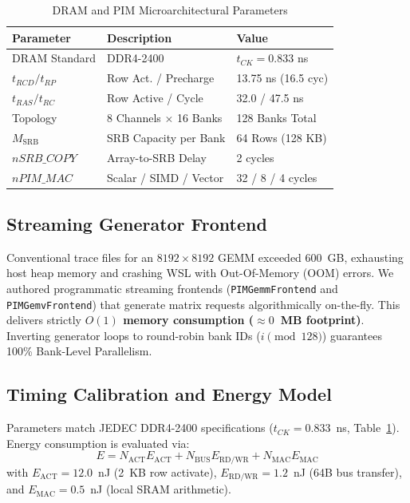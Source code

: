 \documentclass[10pt,twocolumn]{article}
\begin{document}
\begin{table}[t]
\centering
\footnotesize
\caption{DRAM and PIM Microarchitectural Parameters}
\label{tab:dram_timings}
\begin{tabularx}{\columnwidth}{lXl}
\toprule
\textbf{Parameter} & \textbf{Description} & \textbf{Value} \\
\midrule
DRAM Standard & DDR4-2400 & $t_{CK} = 0.833$ ns \\
$t_{RCD} / t_{RP}$ & Row Act. / Precharge & 13.75 ns (16.5 cyc) \\
$t_{RAS} / t_{RC}$ & Row Active / Cycle & 32.0 / 47.5 ns \\
Topology & 8 Channels $\times$ 16 Banks & 128 Banks Total \\
$M_{\text{SRB}}$ & SRB Capacity per Bank & 64 Rows (128 KB) \\
$nSRB\_COPY$ & Array-to-SRB Delay & 2 cycles \\
$nPIM\_MAC$ & Scalar / SIMD / Vector & 32 / 8 / 4 cycles \\
\bottomrule
\end{tabularx}
\end{table}

\subsection{Streaming Generator Frontend}
Conventional trace files for an $8192 \times 8192$ GEMM exceeded 600~GB, exhausting host heap memory and crashing WSL with Out-Of-Memory (OOM) errors. We authored programmatic streaming frontends (\texttt{PIMGemmFrontend} and \texttt{PIMGemvFrontend}) that generate matrix requests algorithmically on-the-fly. This delivers strictly \textbf{$O(1)$ memory consumption ($\approx 0$~MB footprint)}. Inverting generator loops to round-robin bank IDs ($i \pmod{128}$) guarantees 100\% Bank-Level Parallelism.

\subsection{Timing Calibration and Energy Model}
Parameters match JEDEC DDR4-2400 specifications ($t_{CK} = 0.833$~ns, Table~\ref{tab:dram_timings}). Energy consumption is evaluated via:
\begin{equation}
    E = N_{\text{ACT}} E_{\text{ACT}} + N_{\text{BUS}} E_{\text{RD/WR}} + N_{\text{MAC}} E_{\text{MAC}}
\end{equation}
with $E_{\text{ACT}} = 12.0$~nJ (2~KB row activate), $E_{\text{RD/WR}} = 1.2$~nJ (64B bus transfer), and $E_{\text{MAC}} = 0.5$~nJ (local SRAM arithmetic).
\end{document}
